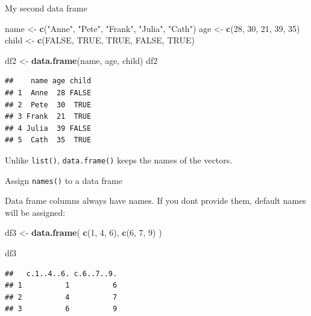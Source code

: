 \documentclass[ignorenonframetext,]{beamer}
\newenvironment{Shaded}{\begin{snugshade}}{\end{snugshade}}
\newcommand{\DecValTok}[1]{\textcolor[rgb]{0.00,0.00,0.81}{#1}}
\newcommand{\KeywordTok}[1]{\textcolor[rgb]{0.13,0.29,0.53}{\textbf{#1}}}
\newcommand{\NormalTok}[1]{#1}
\newcommand{\OtherTok}[1]{\textcolor[rgb]{0.56,0.35,0.01}{#1}}
\newcommand{\StringTok}[1]{\textcolor[rgb]{0.31,0.60,0.02}{#1}}
\begin{document}
\begin{frame}[fragile]{My second data frame}
\protect\hypertarget{my-second-data-frame}{}

\begin{Shaded}
\begin{Highlighting}[]
\NormalTok{name <-}\StringTok{ }\KeywordTok{c}\NormalTok{(}\StringTok{"Anne"}\NormalTok{, }\StringTok{"Pete"}\NormalTok{, }\StringTok{"Frank"}\NormalTok{, }\StringTok{"Julia"}\NormalTok{, }\StringTok{"Cath"}\NormalTok{)}
\NormalTok{age <-}\StringTok{ }\KeywordTok{c}\NormalTok{(}\DecValTok{28}\NormalTok{, }\DecValTok{30}\NormalTok{, }\DecValTok{21}\NormalTok{, }\DecValTok{39}\NormalTok{, }\DecValTok{35}\NormalTok{)}
\NormalTok{child <-}\StringTok{ }\KeywordTok{c}\NormalTok{(}\OtherTok{FALSE}\NormalTok{, }\OtherTok{TRUE}\NormalTok{, }\OtherTok{TRUE}\NormalTok{, }\OtherTok{FALSE}\NormalTok{, }\OtherTok{TRUE}\NormalTok{)}

\NormalTok{df2 <-}\StringTok{ }\KeywordTok{data.frame}\NormalTok{(name, age, child)}
\NormalTok{df2}
\end{Highlighting}
\end{Shaded}

\begin{verbatim}
##    name age child
## 1  Anne  28 FALSE
## 2  Pete  30  TRUE
## 3 Frank  21  TRUE
## 4 Julia  39 FALSE
## 5  Cath  35  TRUE
\end{verbatim}

Unlike \texttt{list()}, \texttt{data.frame()} keeps the names of the
vectors.

\end{frame}

\begin{frame}[fragile]{Assign \texttt{names()} to a data frame}
\protect\hypertarget{assign-names-to-a-data-frame}{}

Data frame columns always have names. If you dont provide them, default
names will be assigned:

\begin{Shaded}
\begin{Highlighting}[]
\NormalTok{df3 <-}\StringTok{ }\KeywordTok{data.frame}\NormalTok{(}
  \KeywordTok{c}\NormalTok{(}\DecValTok{1}\NormalTok{, }\DecValTok{4}\NormalTok{, }\DecValTok{6}\NormalTok{),}
  \KeywordTok{c}\NormalTok{(}\DecValTok{6}\NormalTok{, }\DecValTok{7}\NormalTok{, }\DecValTok{9}\NormalTok{)}
\NormalTok{) }

\NormalTok{df3}
\end{Highlighting}
\end{Shaded}

\begin{verbatim}
##   c.1..4..6. c.6..7..9.
## 1          1          6
## 2          4          7
## 3          6          9
\end{verbatim}

\end{frame}
\end{document}
